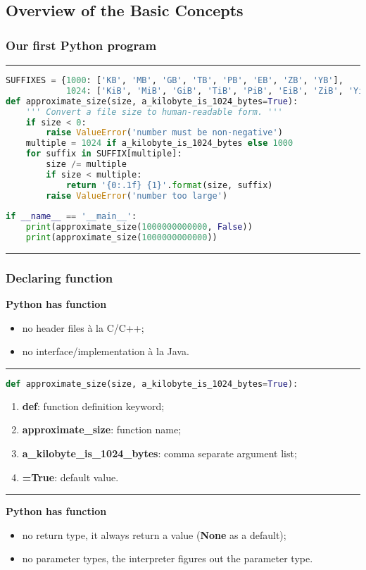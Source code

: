 \subsection{Overview of the Basic Concepts}	

\subsubsection{Our first Python program}
\hrule
\begin{lstlisting}[language=Python, caption=humanize.py]
SUFFIXES = {1000: ['KB', 'MB', 'GB', 'TB', 'PB', 'EB', 'ZB', 'YB'], 
            1024: ['KiB', 'MiB', 'GiB', 'TiB', 'PiB', 'EiB', 'ZiB', 'YiB']}
def approximate_size(size, a_kilobyte_is_1024_bytes=True):
	''' Convert a file size to human-readable form. '''
	if size < 0:
		raise ValueError('number must be non-negative')
	multiple = 1024 if a_kilobyte_is_1024_bytes else 1000
	for suffix in SUFFIX[multiple]:
		size /= multiple
		if size < multiple:
			return '{0:.1f} {1}'.format(size, suffix)
		raise ValueError('number too large')
				
if __name__ == '__main__':
	print(approximate_size(1000000000000, False))
	print(approximate_size(1000000000000))
\end{lstlisting}
\hrule	

\subsubsection{Declaring function}	
\textbf{Python has function}
\begin{itemize}
	\item no header files à la C/C++;
	\item no interface/implementation à la Java.
\end{itemize}			
\hrule
\begin{lstlisting}[language=Python]
def approximate_size(size, a_kilobyte_is_1024_bytes=True):
\end{lstlisting}	
\begin{enumerate}
	\item \textbf{def}: function definition keyword;
	\item \textbf{approximate\_size}: function name;
	\item \textbf{a\_kilobyte\_is\_1024\_bytes}: comma separate argument list;
	\item \textbf{=True}: default value.
\end{enumerate}
\hrule		
\textbf{Python has function}
\begin{itemize}
	\item no return type, it always return a value (\textbf{None} as a default); 
	\item no parameter types, the interpreter figures out the parameter type.
\end{itemize}	

